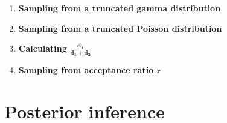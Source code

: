 \documentclass[11pt]{article}
\begin{document}
\begin{enumerate}[label=(\roman*), itemsep=10mm]
\item \textbf{Sampling from a truncated gamma distribution}

\item \textbf{Sampling from a truncated Poisson distribution}

\item \textbf{Calculating } $\displaystyle \boldsymbol{\frac{d_1}{d_1 + d_2}}$

\item \textbf{Sampling from acceptance ratio $\boldsymbol{r}$}

\end{enumerate}





\section{Posterior inference}
\end{document}
